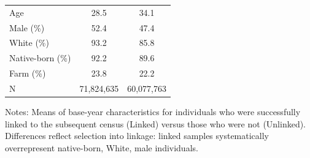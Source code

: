 \begin{table}[H]
\begin{threeparttable}
\begin{tabular}{lcc}
\quad Age & 28.5 & 34.1 \\
\quad Male (\%) & 52.4 & 47.4 \\
\quad White (\%) & 93.2 & 85.8 \\
\quad Native-born (\%) & 92.2 & 89.6 \\
\quad Farm (\%) & 23.8 & 22.2 \\
\quad N & 71,824,635 & 60,077,763 \\
\bottomrule
\end{tabular}
\begin{tablenotes}[flushleft]
\small
\item Notes: Means of base-year characteristics for individuals who were successfully linked to the subsequent census (Linked) versus those who were not (Unlinked). Differences reflect selection into linkage: linked samples systematically overrepresent native-born, White, male individuals.
\end{tablenotes}
\end{threeparttable}
\label{tab:balance}
\end{table}

